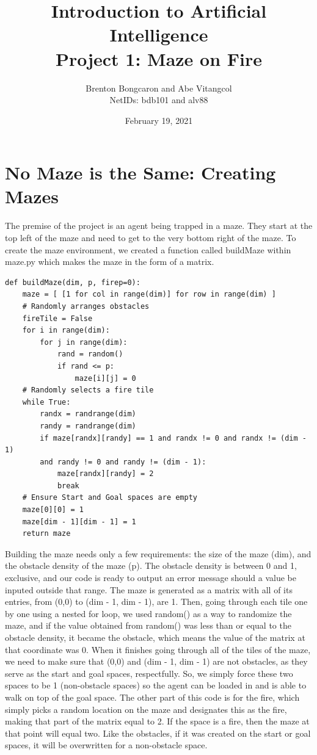 \documentclass[11pt]{article}
\title{\textbf{Introduction to Artificial Intelligence\\
		\large Project 1: Maze on Fire}}
\author{Brenton Bongcaron and Abe Vitangcol\\NetIDs: bdb101 and alv88}
\date{February 19, 2021}
\begin{document}
	\maketitle
	\pagebreak
\section{No Maze is the Same: Creating Mazes}
The premise of the project is an agent being trapped in a maze. They start at the top left of the maze and need to get to the very bottom right of the maze. To create the maze environment, we created a function called buildMaze within maze.py which makes the maze in the form of a matrix.
\begin{verbatim}
def buildMaze(dim, p, firep=0):
    maze = [ [1 for col in range(dim)] for row in range(dim) ]
    # Randomly arranges obstacles
    fireTile = False
    for i in range(dim):
        for j in range(dim):
            rand = random()
            if rand <= p:
                maze[i][j] = 0
    # Randomly selects a fire tile
    while True:
        randx = randrange(dim)
        randy = randrange(dim)
        if maze[randx][randy] == 1 and randx != 0 and randx != (dim - 1)
        and randy != 0 and randy != (dim - 1):
            maze[randx][randy] = 2
            break
    # Ensure Start and Goal spaces are empty
    maze[0][0] = 1
    maze[dim - 1][dim - 1] = 1
    return maze

\end{verbatim}
Building the maze needs only a few requirements: the size of the maze (dim), and the obstacle density of the maze (p). The obstacle density is between 0 and 1, exclusive, and our code is ready to output an error message should a value be inputed outside that range. The maze is generated as a matrix with all of its entries, from (0,0) to (dim - 1, dim - 1), are 1. Then, going through each tile one by one using a nested for loop, we used random() as a way to randomize the maze, and if the value obtained from random() was less than or equal to the obstacle density, it became the obstacle, which means the value of the matrix at that coordinate was 0. When it finishes going through all of the tiles of the maze, we need to make sure that (0,0) and (dim - 1, dim - 1) are not obstacles, as they serve as the start and goal spaces, respectfully. So, we simply force these two spaces to be 1 (non-obstacle spaces) so the agent can be loaded in and is able to walk on top of the goal space.
The other part of this code is for the fire, which simply picks a random location on the maze and designates this as the fire, making that part of the matrix equal to 2. If the space is a fire, then the maze at that point will equal two. Like the obstacles, if it was created on the start or goal spaces, it will be overwritten for a non-obstacle space.
	\pagebreak
\end{document}
